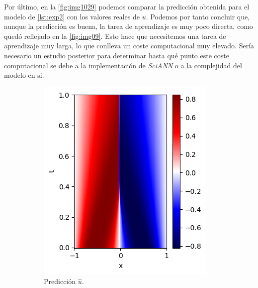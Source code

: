 Por último, en la \autoref{fig:img1029} podemos comparar la predicción obtenida para el modelo de \autoref{lst:exp2} con los valores reales de $u$. Podemos por tanto concluir que, aunque la predicción es buena, la tarea de aprendizaje es muy poco directa, como quedó reflejado en la \autoref{fig:img09}. Esto hace que necesitemos una tarea de aprendizaje muy larga, lo que conlleva un coste computacional muy elevado. Sería necesario un estudio posterior para determinar hasta qué punto este coste computacional se debe a la implementación de \textit{SciANN} o a la complejidad del modelo en si. 

\begin{figure}[htbp]
    \centering
    \begin{subfigure}{0.3\textwidth}
    \centering
    \includegraphics[width=\linewidth]{img/img10.png} 
    \caption{Predicción $\hat{u}$.}
    \label{fig:img10}
    \end{subfigure}   
    \begin{subfigure}{0.3\textwidth}
    \centering

\end{subfigure}
\end{figure}
